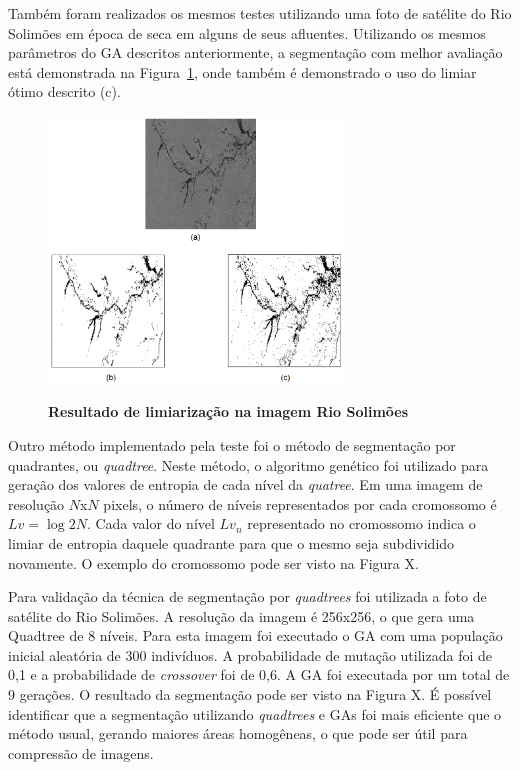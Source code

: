 \documentclass[12pt,oneside,a4paper,english,french,spanish,brazil,]{abntex2}
\begin{document}
Também foram realizados os mesmos testes utilizando uma foto de satélite do Rio Solimões em época de seca em alguns de seus afluentes. Utilizando os mesmos parâmetros do GA descritos anteriormente, a segmentação com melhor avaliação está demonstrada na Figura~\ref{fig:TrCo_Matias_Limiar_2}, onde também é demonstrado o uso do limiar ótimo descrito \cite{gonzalez:2012} (c).

\begin{figure}[ht]
\centering
\caption{\textbf{Resultado de limiarização na imagem Rio Solimões}}
\includegraphics[width=0.7\textwidth]{imagens/TrCo_Matias_Limiar_2.PNG}
\label{fig:TrCo_Matias_Limiar_2}
\end{figure}

Outro método implementado pela teste foi o método de segmentação por quadrantes, ou \textit{quadtree}. Neste método, o algoritmo genético foi utilizado para geração dos valores de entropia de cada nível da \textit{quatree}. Em uma imagem de resolução \(N\)x\(N\) pixels, o número de níveis representados por cada cromossomo é \(Lv=\log 2 N\). Cada valor do nível \(Lv_n\) representado no cromossomo indica o limiar de entropia daquele quadrante para que o mesmo seja subdividido novamente. O exemplo do cromossomo pode ser visto na Figura X.


Para validação da técnica de segmentação por \textit{quadtrees} foi utilizada a foto de satélite do Rio Solimões. A resolução da imagem é 256x256, o que gera uma Quadtree de 8 níveis. Para esta imagem foi executado o GA com uma população inicial aleatória de 300 indivíduos. A probabilidade de mutação utilizada foi de 0,1 e a probabilidade de \textit{crossover} foi de 0,6. A GA foi executada por um total de 9 gerações. O resultado da segmentação pode ser visto na Figura X. É possível identificar que a segmentação utilizando \textit{quadtrees} e GAs foi mais eficiente que o método usual, gerando maiores áreas homogêneas, o que pode ser útil para compressão de imagens.
\end{document}
